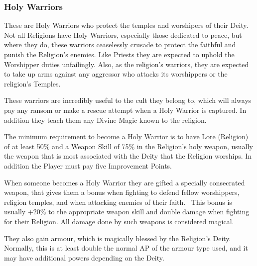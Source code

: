 \subsubsection{Holy Warriors}
These are Holy Warriors who protect the temples and worshipers of their Deity. Not all Religions have Holy Warriors, especially those dedicated to peace, but where they do, these warriors ceaselessly crusade to protect the faithful and punish the Religion’s enemies. Like Priests they are expected to uphold the Worshipper duties unfailingly. Also, as the religion’s warriors, they are expected to take up arms against any aggressor who attacks its worshippers or the religion’s Temples.

These warriors are incredibly useful to the cult they belong to, which will always pay any ransom or make a rescue attempt when a Holy Warrior is captured. In addition they teach them any Divine Magic known to the religion.

The minimum requirement to become a Holy Warrior is to have Lore (Religion) of at least 50\% and a Weapon Skill of 75\% in the Religion’s holy weapon, usually the weapon that is most associated with the Deity that the Religion worships. In addition the Player must pay five Improvement Points.

When someone becomes a Holy Warrior they are gifted a specially consecrated weapon, that gives them a bonus when fighting to defend fellow worshippers, religion temples, and when attacking enemies of their faith.  This bonus is usually +20\% to the appropriate weapon skill and double damage when fighting for their Religion. All damage done by such weapons is considered magical.

They also gain armour, which is magically blessed by the Religion’s Deity. Normally, this is at least double the normal AP of the armour type used, and it may have additional powers depending on the Deity.


